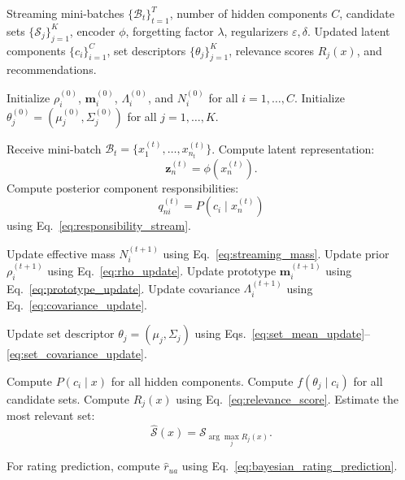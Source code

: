 \documentclass{article}
\theoremstyle{plain}
\theoremstyle{definition}
\theoremstyle{remark}
\begin{document}
\begin{algorithm}[H]
	\caption{Bayesian Latent Filtering for Streaming Recommendation}
	\label{alg:bayesian_latent_filtering}
	\begin{algorithmic}[1]
		\REQUIRE Streaming mini-batches \(\{\mathcal B_t\}_{t=1}^{T}\), number of hidden components \(C\), candidate sets \(\{\mathcal S_j\}_{j=1}^{K}\), encoder \(\phi\), forgetting factor \(\lambda\), regularizers \(\varepsilon,\delta\).
		\ENSURE Updated latent components \(\{c_i\}_{i=1}^{C}\), set descriptors \(\{\theta_j\}_{j=1}^{K}\), relevance scores \(R_j(x)\), and recommendations.
		
		\STATE Initialize \(\rho_i^{(0)}\), \(\mathbf m_i^{(0)}\), \(\Lambda_i^{(0)}\), and \(N_i^{(0)}\) for all \(i=1,\ldots,C\).
		\STATE Initialize \(\theta_j^{(0)}=(\mu_j^{(0)},\Sigma_j^{(0)})\) for all \(j=1,\ldots,K\).
		
		\STATE Receive mini-batch \(\mathcal B_t=\{x_1^{(t)},\ldots,x_{n_t}^{(t)}\}\).
		\STATE Compute latent representation:
		\[
		\mathbf z_n^{(t)}=\phi(x_n^{(t)}).
		\]
		\STATE Compute posterior component responsibilities:
		\[
		q_{ni}^{(t)}=P(c_i\mid x_n^{(t)})
		\]
		using Eq.~\eqref{eq:responsibility_stream}.
		\ENDFOR
		
		\STATE Update effective mass \(N_i^{(t+1)}\) using Eq.~\eqref{eq:streaming_mass}.
		\STATE Update prior \(\rho_i^{(t+1)}\) using Eq.~\eqref{eq:rho_update}.
		\STATE Update prototype \(\mathbf m_i^{(t+1)}\) using Eq.~\eqref{eq:prototype_update}.
		\STATE Update covariance \(\Lambda_i^{(t+1)}\) using Eq.~\eqref{eq:covariance_update}.
		\ENDFOR
		
		\STATE Update set descriptor \(\theta_j=(\mu_j,\Sigma_j)\) using Eqs.~\eqref{eq:set_mean_update}--\eqref{eq:set_covariance_update}.
		\ENDFOR
		
		\STATE Compute \(P(c_i\mid x)\) for all hidden components.
		\STATE Compute \(f(\theta_j\mid c_i)\) for all candidate sets.
		\STATE Compute \(R_j(x)\) using Eq.~\eqref{eq:relevance_score}.
		\STATE Estimate the most relevant set:
		\[
		\widehat{\mathcal S}(x)=\mathcal S_{\arg\max_j R_j(x)}.
		\]
		\ENDFOR
		
		\STATE For rating prediction, compute \(\widehat r_{ua}\) using Eq.~\eqref{eq:bayesian_rating_prediction}.
		\ENDFOR
	\end{algorithmic}
\end{algorithm}
\end{document}
